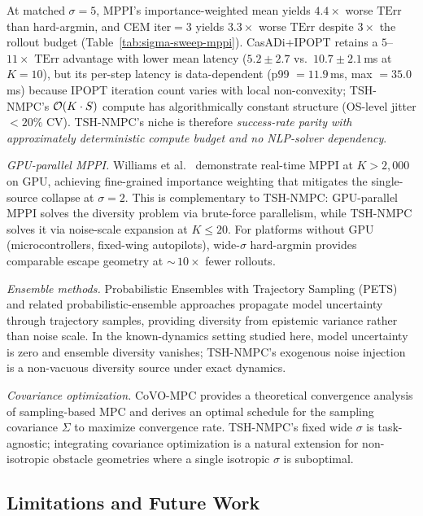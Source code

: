 \documentclass[11pt,onecolumn,a4paper]{article}
\newcommand{\TErr}{\mathrm{TErr}}
\begin{document}
At matched $\sigma = 5$, MPPI's importance-weighted mean yields
$4.4\times$ worse $\TErr$ than hard-argmin, and CEM iter$=3$ yields
$3.3\times$ worse $\TErr$ despite $3\times$ the rollout budget
(Table~\ref{tab:sigma-sweep-mppi}). CasADi+IPOPT retains a
$5$--$11\times$ $\TErr$ advantage with lower mean latency ($5.2 \pm 2.7$
vs.\ $10.7 \pm 2.1\,$ms at $K = 10$), but its per-step latency is
data-dependent (p99 $= 11.9\,$ms, max $= 35.0\,$ms) because IPOPT
iteration count varies with local non-convexity; TSH-NMPC's
${\cal O}(K \cdot S)$ compute has algorithmically constant structure
(OS-level jitter $< 20\%$ CV).  TSH-NMPC's niche is therefore
\emph{success-rate parity with approximately deterministic compute
budget and no NLP-solver dependency}.

\emph{GPU-parallel MPPI.}  Williams et al.\ \cite{WIL17} demonstrate
real-time MPPI at $K > 2{,}000$ on GPU, achieving fine-grained
importance weighting that mitigates the single-source collapse at
$\sigma = 2$.  This is complementary to TSH-NMPC: GPU-parallel MPPI
solves the diversity problem via brute-force parallelism, while
TSH-NMPC solves it via noise-scale expansion at $K \le 20$.
For platforms without GPU (microcontrollers, fixed-wing autopilots),
wide-$\sigma$ hard-argmin provides comparable escape geometry at
${\sim}\,10\times$ fewer rollouts.

\emph{Ensemble methods.}  Probabilistic Ensembles with Trajectory
Sampling (PETS) \cite{CHU18} and related
probabilistic-ensemble approaches propagate model uncertainty through
trajectory samples, providing diversity from epistemic variance rather
than noise scale.  In the known-dynamics setting studied here, model
uncertainty is zero and ensemble diversity vanishes; TSH-NMPC's
exogenous noise injection is a non-vacuous diversity source under
exact dynamics.

\emph{Covariance optimization.}  CoVO-MPC \cite{YI24} provides a
theoretical convergence analysis of sampling-based MPC and derives an
optimal schedule for the sampling covariance $\Sigma$ to maximize
convergence rate.  TSH-NMPC's fixed wide $\sigma$ is task-agnostic;
integrating covariance optimization is a natural extension for
non-isotropic obstacle geometries where a single isotropic $\sigma$ is
suboptimal.

\subsection{Limitations and Future Work}\label{sec:limitations}
\end{document}
